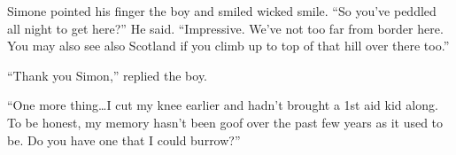 \documentclass{article}
\begin{document}
  Simone pointed his finger the boy and smiled wicked smile. ``So you've peddled all night to get here?'' He said. ``Impressive. We've not too far
  from border here. You may also see also Scotland if you climb up to top of that hill over there too.''

  ``Thank you Simon,'' replied the boy.

  ``One more thing\ldots I cut my knee earlier and hadn't brought a 1st aid kid along. To be honest, my memory hasn't been goof over the past few years
  as it used to be. Do you have one that I could burrow?''
\end{document}
